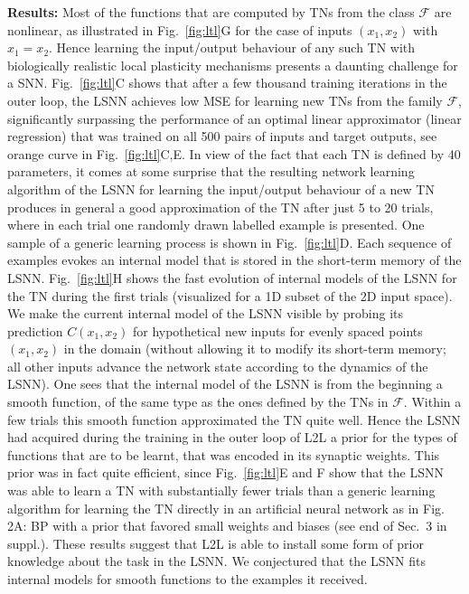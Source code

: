 \documentclass{article} \pdfoutput=1
\begin{document}
\textbf{Results:}
Most of the functions that are computed by TNs from the class $\mathcal{F}$ are nonlinear, as illustrated in  Fig.~\ref{fig:ltl}G for the case of inputs $(x_1, x_2)$ with $x_1  =  x_2$.
Hence learning the input/output behaviour of any such TN with biologically realistic local plasticity mechanisms presents a daunting challenge for a SNN.
Fig.~\ref{fig:ltl}C shows that after a few thousand training iterations in the outer loop, the LSNN achieves low MSE for learning new TNs from the family $\mathcal{F}$, significantly surpassing the performance of an optimal linear approximator (linear regression) that was trained on all 500 pairs of inputs and target outputs, see orange curve in Fig.~\ref{fig:ltl}C,E. 
In view of the fact that each TN is defined by 40 parameters, it comes at some surprise that the resulting network learning algorithm of the LSNN for learning the input/output behaviour of a new TN produces in general a good approximation of the TN after just 5 to 20 trials, where in each trial one randomly drawn labelled example is presented.
One sample of a generic learning process is shown in Fig.~\ref{fig:ltl}D.
Each sequence of examples evokes an internal model that is stored in the short-term memory of the LSNN.
Fig.~\ref{fig:ltl}H shows the fast evolution of internal models of the LSNN for the TN during the first trials (visualized for a 1D subset of the 2D input space).
We make the current internal model of the LSNN visible by probing its prediction $C(x_1,x_2)$ for hypothetical new inputs for evenly spaced points $(x_1, x_2)$ in the domain (without allowing it to modify its short-term memory; all other inputs advance the network state according to the dynamics of the LSNN).
One sees that the internal model of the LSNN is from the beginning a smooth function, of the same type as the ones defined by the TNs in $\mathcal{F}$.
Within a few trials this smooth function approximated the TN quite well.
Hence the LSNN had acquired during the training in the outer loop of L2L a prior for the types of functions that are to be learnt, that was encoded in its synaptic weights.
This prior was in fact quite efficient, since Fig.~\ref{fig:ltl}E and F show that the LSNN was able to learn a TN with substantially fewer trials than a generic learning algorithm for learning the TN directly in an artificial neural network as in Fig. 2A: BP with a prior that favored small weights and biases (see end of Sec.~3 in suppl.).
These results suggest that L2L is able to install some form of prior knowledge about the task in the LSNN.
We conjectured that the LSNN fits internal models for smooth functions to the examples it received.
\end{document}
